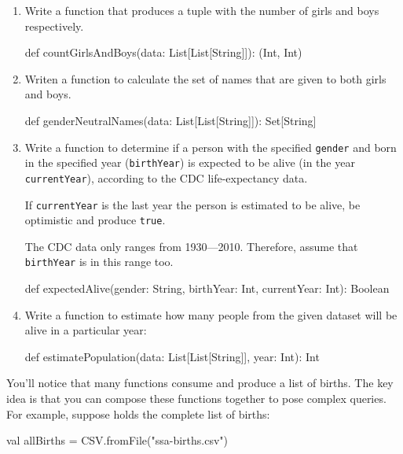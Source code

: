 \begin{enumerate}
  \item Write a function that produces a tuple with the number of girls and boys
   respectively.
  \begin{scalacode}
  def countGirlsAndBoys(data: List[List[String]]): (Int, Int)
  \end{scalacode}

  \item Writen a function to calculate the set of names that are given to both girls and boys.
  \begin{scalacode}
  def genderNeutralNames(data: List[List[String]]): Set[String]
  \end{scalacode}


  \item Write a function to determine if a person with the specified \texttt{gender} and born in the
  specified year (\texttt{birthYear}) is expected to be alive (in the year \texttt{currentYear}),
  according to the CDC life-expectancy data.

    If \texttt{currentYear} is the last year the person is estimated to be alive, be
      optimistic and produce \texttt{true}.

  The CDC data only ranges from 1930---2010. Therefore, assume that
      \texttt{birthYear} is in this range too.

  \begin{scalacode}
  def expectedAlive(gender: String, birthYear: Int, currentYear: Int): Boolean 
  \end{scalacode}

  \item Write a function to estimate how many people from the given dataset
  will be alive in a particular year:

  \begin{scalacode}
  def estimatePopulation(data: List[List[String]], year: Int): Int
  \end{scalacode}

\end{enumerate}



You'll notice that many functions
consume and produce a list of births. The key idea is that you can
compose these functions together to pose complex queries. For example,
suppose  holds the complete list of births:

\begin{scalacode}
val allBirths = CSV.fromFile("ssa-births.csv")
\end{scalacode}

